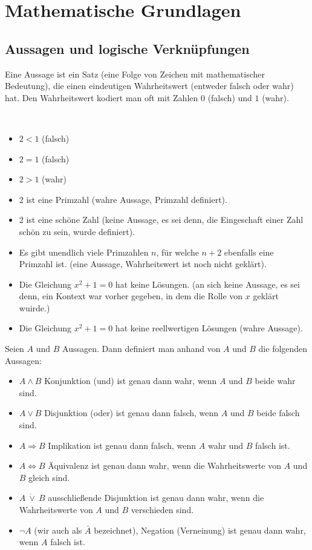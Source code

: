 \chapter{Mathematische Grundlagen}

\section{Aussagen und logische Verknüpfungen}


\begin{defn}
Eine Aussage ist ein Satz (eine Folge von Zeichen mit mathematischer Bedeutung), die einen eindeutigen Wahrheitswert (entweder falsch oder wahr) hat. Den Wahrheitswert kodiert man oft mit Zahlen $0$ (falsch) und $1$ (wahr). 
\end{defn} 


\begin{bsp}\ 
\begin{itemize}
	\item $ 2 < 1 $ (falsch)
	\item $ 2 = 1 $ (falsch)
	\item $ 2 > 1 $ (wahr)
	\item $2$ ist eine Primzahl (wahre Aussage, Primzahl definiert). 
	\item $2$ ist eine schöne Zahl (keine Aussage, es sei denn, die Eingeschaft einer Zahl schön zu sein, wurde definiert). 
	\item Es gibt unendlich viele Primzahlen $n$, für welche $n+2$ ebenfalls eine Primzahl ist. (eine Aussage, Wahrheitswert ist noch nicht geklärt). 
	\item Die Gleichung $x^2+1 =0$ hat keine Lösungen. (an sich keine Aussage, es sei denn, ein Kontext war vorher gegeben, in dem die Rolle von $x$ geklärt wuirde.)
	\item Die Gleichung $x^2+1=0$ hat keine reellwertigen Lösungen (wahre Aussage). 
\end{itemize}
\end{bsp} 

\begin{defn}
Seien $ A $ und $ B $ Aussagen. Dann definiert man anhand von $ A $ und $ B $ die folgenden Aussagen:
\begin{itemize}
	\item $ A \wedge B $ Konjunktion (\glqq und\grqq) ist genau dann wahr, wenn $A$ und $B$ beide wahr sind. 
	\item $ A \vee B $ Disjunktion (\glqq oder\grqq) ist genau dann falsch, wenn $A$ und $B$ beide falsch sind. 
	\item $ A \Rightarrow B $ Implikation ist genau dann falsch, wenn $A$ wahr und $B$ falsch ist. 
	\item $ A \Leftrightarrow B $ Äquivalenz ist genau dann wahr, wenn die Wahrheitswerte von $A$ und $B$ gleich sind. 
	\item $ A \:\dot{\vee}\: B $ ausschließende Disjunktion ist genau dann wahr, wenn die Wahrheitswerte von $A$ und $B$ verschieden sind. 
	\item $ \neg A $ (wir auch als $ \bar{A} $ bezeichnet), Negation (Verneinung) ist genau dann wahr, wenn $A$ falsch ist. 
\end{itemize}
\end{defn}


